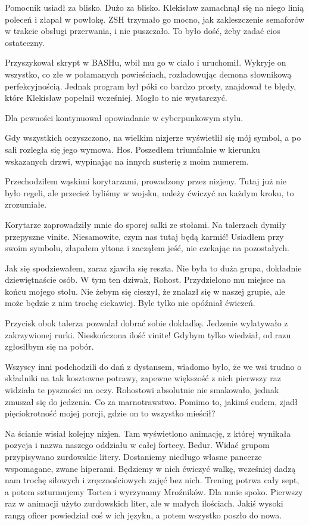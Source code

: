 \divider{}

Pomocnik usiadł za blisko.
Dużo za blisko.
Klekisław zamachnął się na niego linią poleceń i złapał w powłokę.
ZSH trzymało go mocno, jak zakleszczenie semaforów w trakcie obsługi przerwania, i nie puszczało.
To było dość, żeby zadać cios ostateczny.

Przyszykował skrypt w BASHu, wbił mu go w ciało i uruchomił.
Wykryje on wszystko, co złe w połamanych powieściach, rozładowując demona słownikową perfekcyjnością.
Jednak program był póki co bardzo prosty, znajdował te błędy, które Klekisław popełnił wcześniej.
Mogło to nie wystarczyć.

Dla pewności kontynuował opowiadanie w cyberpunkowym stylu.

\divider{}

Gdy wszystkich oczyszczono, na wielkim nizjerze wyświetlił się mój symbol, a po sali rozległa się jego wymowa.
Hos.
Poszedłem triumfalnie w kierunku wskazanych drzwi, wypinając na innych susterię z moim numerem.

Przechodziłem wąskimi korytarzami, prowadzony przez nizjeny. 
Tutaj już nie było regeli, ale przecież byliśmy w wojsku, należy ćwiczyć na każdym kroku, to zrozumiałe.

Korytarze zaprowadziły mnie do sporej salki ze stołami.
Na talerzach dymiły przepyszne vinite.
Niesamowite, czym nas tutaj będą karmić!
Usiadłem przy swoim symbolu, złapałem yltona i zacząłem jeść, nie czekając na pozostałych.

Jak się spodziewałem, zaraz zjawiła się reszta.
Nie była to duża grupa, dokładnie dziewiętnaście osób.
W tym ten dziwak, Rohost.
Przydzielono mu miejsce na końcu mojego stołu.
Nie żebym się cieszył, że znalazł się w naszej grupie, ale może będzie z nim trochę ciekawiej.
Byle tylko nie opóźniał ćwiczeń.

Przycisk obok talerza pozwalał dobrać sobie dokładkę.
Jedzenie wylatywało z zakrzywionej rurki.
Nieskończona ilość vinite! Gdybym tylko wiedział, od razu zgłosiłbym się na pobór.

Wszyscy inni podchodzili do dań z dystansem, wiadomo było, że we wsi trudno o składniki na tak kosztowne potrawy, zapewne większość z nich pierwszy raz widziała te pyszności na oczy.
Rohostowi absolutnie nie smakowało, jednak zmuszał się do jedzenia.
Co za marnotrawstwo.
Pomimo to, jakimś cudem, zjadł pięciokrotność mojej porcji, gdzie on to wszystko mieścił?

Na ścianie wisiał kolejny nizjen.
Tam wyświetlono animację, z której wynikała pozycja i nazwa naszego oddziału w całej fortecy. Bedur. Widać grupom przypisywano zurdowskie litery.
Dostaniemy niedługo własne pancerze wspomagane, zwane hiperami.
Będziemy w nich ćwiczyć walkę, wcześniej dadzą nam trochę siłowych i zręcznościowych zajęć bez nich.
Trening potrwa cały sept, a potem szturmujemy Torten i wyrzynamy Mroźników.
Dla mnie spoko.
Pierwszy raz w animacji użyto zurdowskich liter, ale w małych ilościach.
Jakiś wysoki rangą oficer powiedział coś w ich języku, a potem wszystko poszło do nowa.

